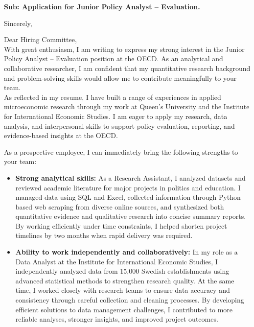 \documentclass[11pt,a4paper,roman]{moderncv}
\begin{document}
\date{\today}
\opening{\textbf{Sub: Application for Junior Policy Analyst -- Evaluation.}}
\closing{Sincerely, \vspace{-1em}}


\makelettertitle



Dear Hiring Committee,
\\
\vspace{1em}
With great enthusiasm, I am writing to express my strong interest in the Junior Policy Analyst -- Evaluation position at the OECD. As an analytical and collaborative researcher, I am confident that my quantitative research background and problem-solving skills would allow me to contribute meaningfully to your team.\\

\vspace{1em}
As reflected in my resume, I have built a range of experiences in applied microeconomic research through my work at Queen's University and the Institute for International Economic Studies. I am eager to apply my research, data analysis, and interpersonal skills to support policy evaluation, reporting, and evidence-based insights at the OECD.\\
\vspace{1em}

As a prospective employee, I can immediately bring the following strengths to your team:
\vspace{0.5em}
\begin{itemize}
\item \textbf{Strong analytical skills:} As a Research Assistant, I analyzed datasets and reviewed academic literature for major projects in politics and education. I managed data using SQL and Excel, collected information through Python-based web scraping from diverse online sources, and synthesized both quantitative evidence and qualitative research into concise summary reports. By working efficiently under time constraints, I helped shorten project timelines by two months when rapid delivery was required.
\item \textbf{Ability to work independently and collaboratively:} In my role as a Data Analyst at the Institute for International Economic Studies, I independently analyzed data from 15,000 Swedish establishments using advanced statistical methods to strengthen research quality. At the same time, I worked closely with research teams to ensure data accuracy and consistency through careful collection and cleaning processes. By developing efficient solutions to data management challenges, I contributed to more reliable analyses, stronger insights, and improved project outcomes.
\end{itemize}
\end{document}
